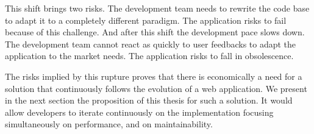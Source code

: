 This shift brings two risks.
The development team needs to rewrite the code base to adapt it to a completely different paradigm.
The application risks to fail because of this challenge.
And after this shift the development pace slows down.
The development team cannot react as quickly to user feedbacks to adapt the application to the market needs.
The application risks to fall in obsolescence.



The risks implied by this rupture proves that there is economically a need for a solution that continuously follows the evolution of a web application.
We present in the next section the proposition of this thesis for such a solution.
It would allow developers to iterate continuously on the implementation focusing simultaneously on performance, and on maintainability.





























